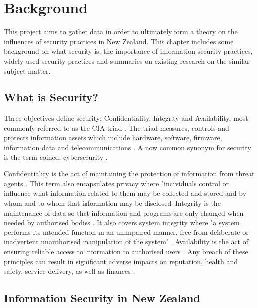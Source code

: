 \chapter{Background}\label{C:Background}

\par This project aims to gather data in order to ultimately form a theory on the influences of security practices in New Zealand. This chapter includes some background on what security is, the importance of information security practices, widely used security practices and summaries on existing research on the similar subject matter. 

\section{What is Security?}
\par Three objectives define security; Confidentiality, Integrity and Availability, most commonly referred to as the CIA triad \cite{craigbook}. The triad measures, controls and protects information assets which include hardware, software, firmware,  information data and telecommunications \cite{nist}. A now common synonym for security is the term coined; cybersecurity \cite{nist}. 
\newline
\par Confidentiality is the act of maintaining the protection of information from threat agents \cite{craigbook}. This term also encapsulates privacy where "individuals control or influence what information related to them may be collected and stored and by whom and to whom that information may be disclosed\cite{craigbook}. Integrity is the maintenance of data so that information and programs are only changed when needed by authorised bodies \cite{craigbook}. It also covers system integrity where "a system performs its intended function in an unimpaired manner, free from deliberate or inadvertent unauthorised manipulation of the system" \cite{craigbook}. Availability is the act of ensuring reliable access to information to authorised users \cite{craigbook}.  Any breach of these principles can result in significant adverse impacts on reputation, health and safety, service delivery, as well as finances \cite{imp}.

\section{Information Security in New Zealand}

